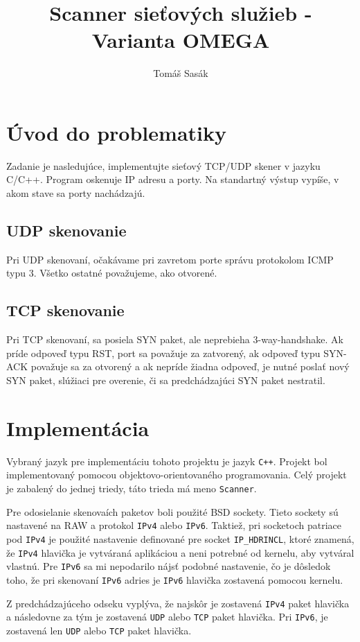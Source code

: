 \documentclass[titlepage]{article}
\begin{document}
\title{Scanner sieťových služieb - Varianta OMEGA}
\author{Tomáš Sasák}
\maketitle

\tableofcontents
\newpage

\section{Úvod do problematiky}
Zadanie je nasledujúce, implementujte sieťový TCP/UDP skener v jazyku C/C++. Program oskenuje IP adresu a porty. Na standartný výstup vypíše, v akom stave sa porty nachádzajú.
\subsection{UDP skenovanie}
Pri UDP skenovaní, očakávame pri zavretom porte správu protokolom ICMP typu 3. Všetko ostatné považujeme, ako otvorené.
\subsection{TCP skenovanie}
Pri TCP skenovaní, sa posiela SYN paket, ale neprebieha 3-way-handshake. Ak príde odpoveď typu RST, port sa považuje za zatvorený, ak odpoveď typu SYN-ACK považuje sa za otvorený a ak nepríde žiadna odpoveď, je nutné poslať nový SYN paket, slúžiaci pre overenie, či sa predchádzajúci SYN paket nestratil.

\newpage
\section{Implementácia}
Vybraný jazyk pre implementáciu tohoto projektu je jazyk \verb|C++|. Projekt bol implementovaný pomocou objektovo-orientovaného programovania. Celý projekt je zabalený do jednej triedy, táto trieda má meno \verb|Scanner|.
 \par Pre odosielanie skenovaích paketov boli použité BSD sockety. Tieto sockety sú nastavené na RAW a protokol \verb|IPv4| alebo \verb|IPv6|. Taktiež, pri socketoch patriace pod \verb|IPv4| je použité nastavenie definované pre socket \verb|IP_HDRINCL|, ktoré znamená, že \verb|IPv4| hlavička je vytváraná aplikáciou a neni potrebné od kernelu, aby vytváral vlastnú. Pre \verb|IPv6| sa mi nepodarilo nájsť podobné nastavenie, čo je dôsledok toho, že pri skenovaní \verb|IPv6| adries je \verb|IPv6| hlavička zostavená pomocou kernelu.
 \par Z predchádzajúceho odseku vyplýva, že najskôr je zostavená \verb|IPv4| paket hlavička a následovne za tým je zostavená \verb|UDP| alebo \verb|TCP| paket hlavička. Pri \verb|IPv6|, je zostavená len \verb|UDP| alebo \verb|TCP| paket hlavička.
\end{document}
